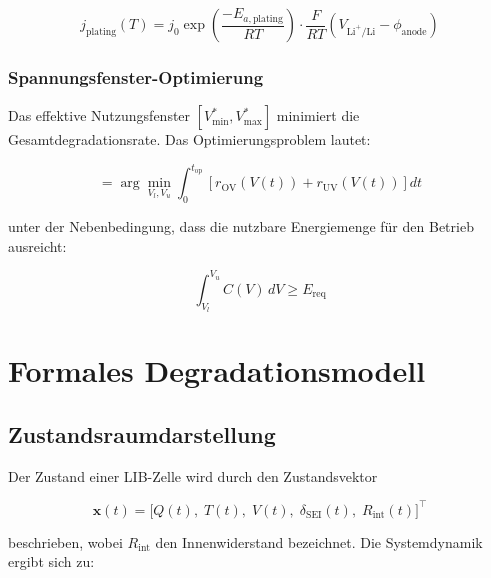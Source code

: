 ﻿\documentclass[12pt,a4paper]{article}
\begin{document}
	\begin{equation}
		j_\mathrm{plating}(T) = j_0 \exp\!\left(\frac{-E_{a,\mathrm{plating}}}{RT}\right) \cdot
		\frac{F}{RT}\left(V_\mathrm{Li^+/Li} - \phi_\mathrm{anode}\right)
		\label{eq:li_plating}
	\end{equation}
	
	\subsubsection{Spannungsfenster-Optimierung}
	
	Das effektive Nutzungsfenster $[V_\mathrm{min}^*, V_\mathrm{max}^*]$ minimiert
	die Gesamtdegradationsrate. Das Optimierungsproblem lautet:
	
	\begin{equation}
		[V_\mathrm{min}^*, V_\mathrm{max}^*] = \arg\min_{V_l, V_u}
		\int_0^{t_\mathrm{op}} \left[r_\mathrm{OV}(V(t)) + r_\mathrm{UV}(V(t))\right] dt
		\label{eq:voltage_window_opt}
	\end{equation}
	
	unter der Nebenbedingung, dass die nutzbare Energiemenge für den Betrieb
	ausreicht:
	
	\begin{equation}
		\int_{V_l}^{V_u} C(V)\, dV \geq E_\mathrm{req}
	\end{equation}
	
	\section{Formales Degradationsmodell}
	\label{sec:degradationsmodell}
	
	\subsection{Zustandsraumdarstellung}
	
	Der Zustand einer LIB-Zelle wird durch den Zustandsvektor
	
	\begin{equation}
		\mathbf{x}(t) = \bigl[Q(t),\; T(t),\; V(t),\; \delta_\mathrm{SEI}(t),\; R_\mathrm{int}(t)\bigr]^\top
		\label{eq:state_vector}
	\end{equation}
	
	beschrieben, wobei $R_\mathrm{int}$ den Innenwiderstand bezeichnet. Die
	Systemdynamik ergibt sich zu:
	
\end{document}
